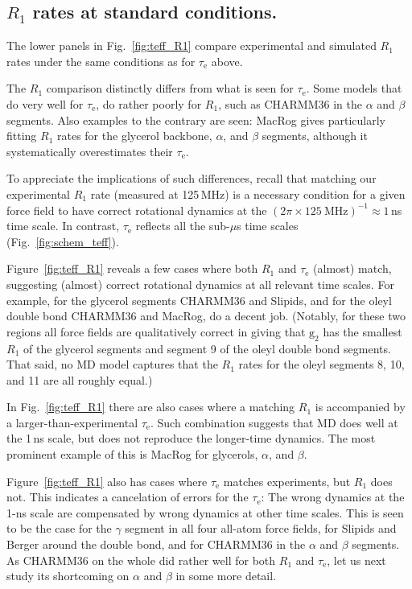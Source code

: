 \documentclass[journal=jpcbfk,manuscript=article,layout=twocolumn]{achemso}
\begin{document}
\subsection*{$R_1$ rates at standard conditions.}
The lower panels in Fig.~\ref{fig:teff_R1} compare experimental and simulated $R_{1}$ rates under the same conditions as for $\tau_\mathrm{e}$ above.

The $R_1$ comparison distinctly differs from what is seen for $\tau_\mathrm{e}$.
Some models that do very well for $\tau_\mathrm{e}$, do rather poorly for $R_1$, such as CHARMM36 in the $\alpha$ and $\beta$ segments.
Also examples to the contrary are seen: MacRog gives particularly fitting $R_{1}$ rates for the glycerol backbone, $\alpha$, and $\beta$ segments, although it systematically overestimates their $\tau_\mathrm{e}$.

To appreciate the implications of such differences, recall that
matching our experimental $R_1$ rate (measured at 125\,MHz)
is a necessary condition for a given force field to have correct rotational dynamics at the $(2\pi\times125~\mathrm{MHz})^{-1}\approx1$\,ns time scale.
In contrast, $\tau_\mathrm{e}$ reflects all the sub-$\mu$s time scales (Fig.~\ref{fig:schem_teff}).

Figure~\ref{fig:teff_R1} reveals a few cases where both $R_1$ and $\tau_\mathrm{e}$ (almost) match, suggesting (almost) correct rotational dynamics at all relevant time scales.
%
%
For example, for the glycerol segments CHARMM36 and Slipids, %
and for the oleyl double bond CHARMM36 and MacRog,
do a decent job.
%
(Notably, for these two regions
all force fields are qualitatively correct in giving that $\mathrm g_2$ has the smallest $R_1$ of the glycerol segments and segment 9 of the oleyl double bond segments. That said, no MD model captures that the $R_1$ rates for the oleyl segments 8, 10, and 11 are all roughly equal.)

In Fig.~\ref{fig:teff_R1} there are also cases where a matching $R_1$ is accompanied by a larger-than-experimental $\tau_\mathrm{e}$. Such combination suggests that MD does well at the 1\,ns scale, but does not reproduce the longer-time dynamics.
%
The most prominent example of this is MacRog for glycerols, $\alpha$, and $\beta$.

Figure~\ref{fig:teff_R1} also has cases where $\tau_\mathrm{e}$ matches experiments, but $R_1$ does not. This indicates a cancelation of errors for the $\tau_\mathrm{e}$: The wrong dynamics at the 1-ns scale are compensated by wrong dynamics at other time scales.
%
This is seen to be the case for the $\gamma$ segment in all four all-atom force fields,
for Slipids and Berger around the double bond, and
for CHARMM36 in the $\alpha$ and $\beta$ segments.
%
%
As CHARMM36 on the whole did rather well for both $R_1$ and $\tau_\mathrm{e}$,
let us next study its shortcoming on $\alpha$ and $\beta$ in some more detail.
%
\end{document}
